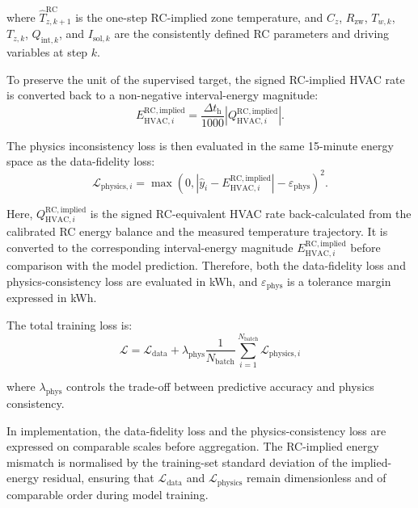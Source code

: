 \documentclass[11pt]{article}
\begin{document}
where $\hat{T}_{z,k+1}^{\mathrm{RC}}$ is the one-step RC-implied zone temperature, and $C_z$, $R_{\mathrm{zw}}$, $T_{w,k}$, $T_{z,k}$, $Q_{\mathrm{int},k}$, and $I_{\mathrm{sol},k}$ are the consistently defined RC parameters and driving variables at step $k$.

To preserve the unit of the supervised target, the signed RC-implied HVAC rate is converted back to a non-negative interval-energy magnitude:
\begin{equation}
E_{\mathrm{HVAC},i}^{\mathrm{RC,implied}}
=
\frac{\Delta t_{\mathrm{h}}}{1000}
\left|Q_{\mathrm{HVAC},i}^{\mathrm{RC,implied}}\right|.
\end{equation}

The physics inconsistency loss is then evaluated in the same 15-minute energy space as the data-fidelity loss:
\begin{equation}
\mathcal{L}_{\mathrm{physics},i}
=
\max\left(
0,
\left|\hat{y}_i-E_{\mathrm{HVAC},i}^{\mathrm{RC,implied}}\right|
-\varepsilon_{\mathrm{phys}}
\right)^2.
\end{equation}

Here, $Q_{\mathrm{HVAC},i}^{\mathrm{RC,implied}}$ is the signed RC-equivalent HVAC rate back-calculated from the calibrated RC energy balance and the measured temperature trajectory. It is converted to the corresponding interval-energy magnitude $E_{\mathrm{HVAC},i}^{\mathrm{RC,implied}}$ before comparison with the model prediction. Therefore, both the data-fidelity loss and physics-consistency loss are evaluated in kWh, and $\varepsilon_{\mathrm{phys}}$ is a tolerance margin expressed in kWh.

The total training loss is:
\begin{equation}
\mathcal{L} = \mathcal{L}_{\text{data}} + \lambda_{\mathrm{phys}} \frac{1}{N_{\text{batch}}} \sum_{i=1}^{N_{\text{batch}}} \mathcal{L}_{\text{physics},i}
\end{equation}

where $\lambda_{\mathrm{phys}}$ controls the trade-off between predictive accuracy and physics consistency.

In implementation, the data-fidelity loss and the physics-consistency loss are expressed on comparable scales before aggregation. The RC-implied energy mismatch is normalised by the training-set standard deviation of the implied-energy residual, ensuring that $\mathcal{L}_{\mathrm{data}}$ and $\mathcal{L}_{\mathrm{physics}}$ remain dimensionless and of comparable order during model training.
\end{document}
